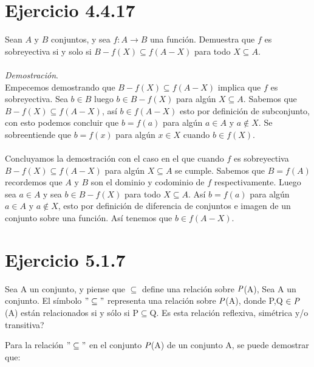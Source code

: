 \documentclass{report}
\begin{document}
    \section{Ejercicio 4.4.17}

        Sean $A$ y $B$ conjuntos, y sea $f: A \rightarrow B$ una función. Demuestra que $f$ es sobreyectiva si y solo si $B-f(X) \subseteq f(A-X)$ para todo $X \subseteq A$.\\\\
        \noindent \textit{Demostración}.\\
        Empecemos demostrando que $B-f(X) \subseteq f(A-X)$ implica que $f$ es sobreyectiva. Sea $b \in B$ luego $b \in B - f(X)$ para algún $X \subseteq A$. Sabemos que $B-f(X) \subseteq f(A-X)$, así $b \in f(A - X)$ esto por definición de subconjunto, con esto podemos concluir que $b = f(a)$ para algún $a \in A$ y $a \not \in X$. Se sobreentiende  que $b = f(x)$ para algún $x \in X$ cuando $b \in f(X)$.\\\\

        \noindent Concluyamos la demostración con el caso en el que cuando $f$ es sobreyectiva $B-f(X) \subseteq f(A-X)$ para algún $X \subseteq A$ se cumple. Sabemos que $B = f(A)$ recordemos que $A$ y $B$ son el dominio y codominio de $f$ respectivamente. Luego sea $a \in A$ y  sea $b \in B - f(X)$ para todo $X \subseteq A$. Así $b = f(a)$ para algún $a \in A$ y $a \not \in X$, esto por definición de diferencia de conjuntos e imagen de un conjunto sobre una función. Así tenemos que $b \in f(A-X)$.

    \section{Ejercicio 5.1.7}

    Sea A un conjunto, y piense que $\subseteq$ define una relación sobre $\emph{P}$(A), Sea A un conjunto. El símbolo $"\subseteq"$ representa una relación sobre $\emph{P}$(A), donde P,Q $\in \emph{P}$(A) están relacionados si y sólo si P$\subseteq$Q. Es esta relación reflexiva, simétrica y/o transitiva?

Para la relación $"\subseteq"$  en el conjunto  $\emph{P}$(A) de un conjunto A, se puede demostrar que:
\end{document}
